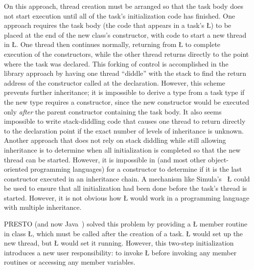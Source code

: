 \documentclass[openright,twoside]{report}
\begin{document}
On this approach, thread creation must be arranged so that the task body does not start execution until all of the task's initialization code has finished.
One approach requires the task body (the code that appears in a \uC task's \LGinlinetrue\LGbegin\lgrinde\L{}\endlgrinde\LGend{}) to be placed at the end of the new class's constructor, with code to start a new thread in \LGinlinetrue\LGbegin\lgrinde\L{}\endlgrinde\LGend{}.
One thread then continues normally, returning from \LGinlinetrue\LGbegin\lgrinde\L{}\endlgrinde\LGend{} to complete execution of the constructors, while the other thread returns directly to the point where the task was declared.
This forking of control is accomplished in the library approach by having one thread ``diddle'' with the stack to find the return address of the constructor called at the declaration.
However, this scheme prevents further inheritance;
it is impossible to derive a type from a task type if the new type requires a constructor, since the new constructor would be executed only \emph{after} the parent constructor containing the task body.
It also seems impossible to write stack-diddling code that causes one thread to return directly to the declaration point if the exact number of levels of inheritance is unknown.
Another approach that does not rely on stack diddling while still allowing inheritance is to determine when all initialization is completed so that the new thread can be started.
However, it is impossible in \CC (and most other object-oriented programming languages) for a constructor to determine if it is the last constructor executed in an inheritance chain.
A mechanism like Simula's~\cite{Simula87} \LGinlinetrue\LGbegin\lgrinde\L{}\endlgrinde\LGend{} could be used to ensure that all initialization had been done before the task's thread is started.
However, it is not obvious how \LGinlinetrue\LGbegin\lgrinde\L{}\endlgrinde\LGend{} would work in a programming language with multiple inheritance.

PRESTO (and now Java~\cite{Java}) solved this problem by providing a \LGinlinetrue\LGbegin\lgrinde\L{}\endlgrinde\LGend{} member routine in class \LGinlinetrue\LGbegin\lgrinde\L{}\endlgrinde\LGend{}, which must be called after the creation of a task.
\LGinlinetrue\LGbegin\lgrinde\L{}\endlgrinde\LGend{} would set up the new thread, but \LGinlinetrue\LGbegin\lgrinde\L{}\endlgrinde\LGend{} would set it running.
However, this two-step initialization introduces a new user responsibility: to invoke \LGinlinetrue\LGbegin\lgrinde\L{}\endlgrinde\LGend{} before invoking any member routines or accessing any member variables.
\end{document}
